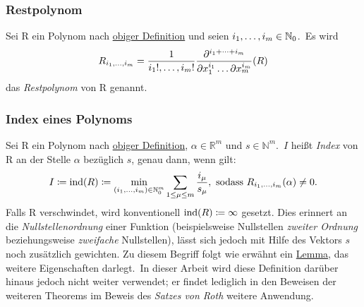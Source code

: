     \subsubsection{Restpolynom}
        \label{subsubsec:def-rempoly}
        Sei R ein Polynom nach \hyperref[subsubsec:def-poly]{obiger Definition} und seien $i_1, \dots, i_m \in
        \mathbb{N}_0$.\ Es wird
        \begin{equation}
            R_{i_1, \dots, i_m} = \frac{1}{i_1!, \dots, i_m!} \frac{\partial^{i_1 + \dots + i_m}}{
                \partial x_1^{i_1} \dots \partial x_m^{i_m}} (R) \label{eq:def-rempoly}
        \end{equation}
        das \emph{Restpolynom} von R genannt.
    
    \subsubsection{Index eines Polynoms}
        \label{subsubsec:def-index}
        \textrm{Sei R ein Polynom nach \hyperref[subsubsec:def-poly]{obiger Definition}, $\alpha \in \mathbb{R}^m$
            und $s \in \mathbb{N}^m$.\ $I$ heißt \emph{Index} von R an der Stelle $\alpha$ bezüglich $s$, genau dann,
            wenn gilt:}
        \begin{equation}
            I \coloneq \operatorname{ind}(R) \coloneq \min_{(i_1, \dots, i_m) \in \mathbb{N}_0^m} \sum_{1 \leq \mu \leq m} \frac{i_\mu}
            {s_\mu}, \ \textrm{sodass}\  R_{i_1, \dots, i_m}(\alpha) \neq 0. \label{eq:def-index}
        \end{equation}
        Falls R verschwindet, wird konventionell $\operatorname{ind}(R) \coloneq \infty$ gesetzt.
        \newline
        \textrm{Dies erinnert an die \emph{Nullstellenordnung} einer Funktion (beispielsweise Nullstellen
        \emph{zweiter Ordnung} beziehungsweise \emph{zweifache} Nullstellen), lässt sich jedoch mit Hilfe des
        Vektors $s$ noch zusätzlich gewichten.
        \newline
        Zu diesem Begriff folgt wie erwähnt ein \hyperref[subsec:lemma2]{Lemma}, das weitere Eigenschaften
        darlegt.\ In dieser Arbeit wird diese Definition darüber hinaus jedoch nicht weiter verwendet; er findet lediglich
        in den Beweisen der weiteren Theorems im Beweis des \emph{Satzes von Roth} weitere Anwendung.}
    

